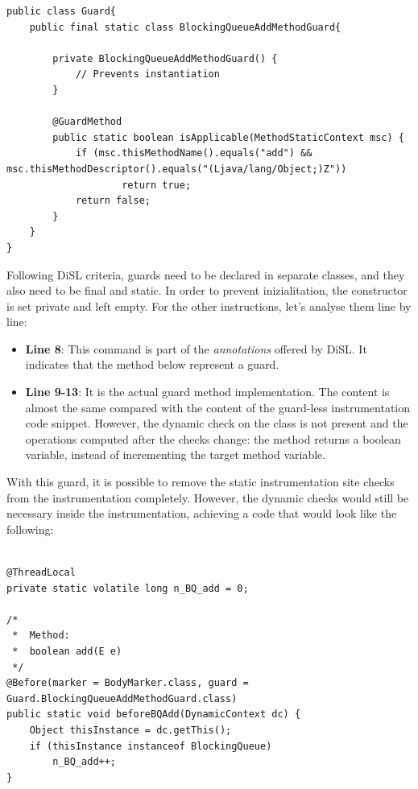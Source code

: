 \documentclass[]{usiinfthesis}
\begin{document}
\vspace*{0.5cm}
\begin{verbatim}
public class Guard{
    public final static class BlockingQueueAddMethodGuard{
    
        private BlockingQueueAddMethodGuard() {
            // Prevents instantiation
        }
    
        @GuardMethod
        public static boolean isApplicable(MethodStaticContext msc) {
            if (msc.thisMethodName().equals("add") && msc.thisMethodDescriptor().equals("(Ljava/lang/Object;)Z"))
                    return true;
            return false;
        }
    }
}
\end{verbatim}

\vspace*{0.5cm}

\noindent
Following DiSL criteria, guards need to be declared in separate classes, and they also need to be final and static. In order to prevent inizialitation, the constructor is set private and left empty. For the other instructions, let's analyse them line by line:


\begin{itemize}
    \item \textbf{Line 8}: This command is part of the \textit{annotations} offered by DiSL. It indicates that the method below represent a guard.
    
    \item \textbf{Line 9-13}: It is the actual guard method implementation. The content is almost the same compared with the content of the guard-less instrumentation code snippet. However, the dynamic check on the class is not present and the operations computed after the checks change: the method returns a boolean variable, instead of incrementing the target method variable.
\end{itemize}

\noindent
With this guard, it is possible to remove the static instrumentation site checks from the instrumentation completely. However, the dynamic checks would still be necessary inside the instrumentation, achieving a code that would look like the following:


\vspace*{0.5cm}
\begin{verbatim}

@ThreadLocal
private static volatile long n_BQ_add = 0;

/*
 *  Method:
 *  boolean add(E e)
 */
@Before(marker = BodyMarker.class, guard = Guard.BlockingQueueAddMethodGuard.class)
public static void beforeBQAdd(DynamicContext dc) {
    Object thisInstance = dc.getThis();
    if (thisInstance instanceof BlockingQueue)
        n_BQ_add++;
}
\end{verbatim}
\end{document}
